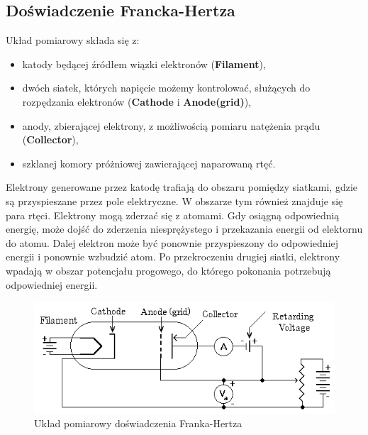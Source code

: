 \documentclass[paper=a4, fontsize=12pt]{scrartcl}
\begin{document}
\subsection{Doświadczenie Francka-Hertza}
Układ pomiarowy składa się z:
\begin{itemize}
\item katody będącej źródłem wiązki elektronów (\textbf{Filament}),
\item dwóch siatek, których napięcie możemy kontrolować, służących do rozpędzania elektronów (\textbf{Cathode} i \textbf{Anode(grid)}),
\item anody, zbierającej elektrony, z możliwością pomiaru natężenia prądu (\textbf{Collector}),
\item szklanej komory próżniowej zawierającej naparowaną rtęć.
\end{itemize}
Elektrony generowane przez katodę trafiają do obszaru pomiędzy siatkami, gdzie są przyspieszane przez pole elektryczne. W obszarze tym również znajduje się para rtęci. Elektrony mogą zderzać się z atomami. Gdy osiągną odpowiednią energię, może dojść do zderzenia niesprężystego i przekazania energii od elektornu do atomu. Dalej elektron może być ponownie przyspieszony do odpowiedniej energii i ponownie wzbudzić atom. Po przekroczeniu drugiej siatki, elektrony wpadają w obszar potencjału progowego, do którego pokonania potrzebują odpowiedniej energii.
		\begin{figure}[h!]
			\centering
			\includegraphics[width=10 cm]{e.png}
			\caption{Układ pomiarowy doświadczenia Franka-Hertza}
		\end{figure}
\end{document}
